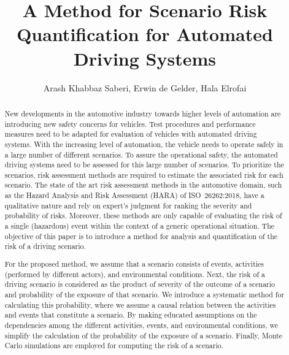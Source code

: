 \documentclass[letterpaper, 10 pt, conference]{ieeeconf}  %
\title{\LARGE \bf
A Method for Scenario Risk Quantification for Automated Driving Systems
}
\author{Arash Khabbaz Saberi, Erwin de Gelder, Hala Elrofai}
\begin{document}
\maketitle
\thispagestyle{empty}
\pagestyle{empty}


\begin{abstract}
	
	



	
New developments in the automotive industry towards higher levels of automation are introducing new safety concerns for vehicles. 
Test procedures and performance measures need to be adapted for evaluation of vehicles with automated driving systems. 
With the increasing level of automation, the vehicle needs to operate safely in a large number of different scenarios. To assure the operational safety, the automated driving systems need to be assessed for this large number of scenarios. To prioritize the scenarios, risk assessment methods are required to estimate the associated risk for each scenario.
The state of the art risk assessment methods in the automotive domain, 
	such as the Hazard Analysis and Risk Assessment (HARA) of ISO~26262:2018, 
	have a qualitative nature and rely on expert's judgment for ranking the severity and probability of risks.
Moreover, these methods are only capable of evaluating the risk of a single (hazardous) event within the context of a generic operational situation.
The objective of this paper is to introduce a method for analysis and quantification of the risk of a driving scenario.

For the proposed method, we assume that a scenario consists of events, activities (performed by different actors), and environmental conditions.
Next, the risk of a driving scenario is considered as the product of severity of the outcome of a scenario and probability of the exposure of that scenario.
We introduce a systematic method for calculating this probability, 
	where we assume a causal relation between the activities and events that constitute a scenario. 
By making educated assumptions on the dependencies among the different activities, events, and environmental conditions, 
	we simplify the calculation of the probability of the exposure of a scenario. 
Finally, Monte Carlo simulations are employed for computing the risk of a scenario.



\end{abstract}
\end{document}
